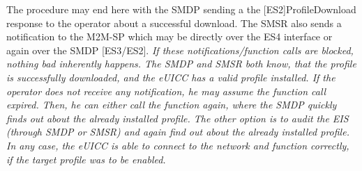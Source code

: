 The procedure may end here with the SMDP sending a the [ES2]ProfileDownload response to the operator about a successful download. The SMSR also sends a notification to the M2M-SP which may be directly over the ES4 interface or again over the SMDP [ES3/ES2]. \textit{If these notifications/function calls are blocked, nothing bad inherently happens. The SMDP and SMSR both know, that the profile is successfully downloaded, and the eUICC has a valid profile installed. If the operator does not receive any notification, he may assume the function call expired. Then, he can either call the function again, where the SMDP quickly finds out about the already installed profile. The other option is to audit the EIS (through SMDP or SMSR) and again find out about the already installed profile. In any case, the eUICC is able to connect to the network and function correctly, if the target profile was to be enabled.}

